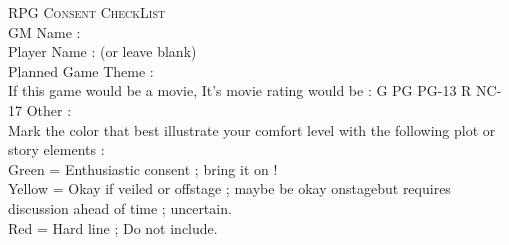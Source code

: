 \documentclass[11pt,twoside,a4paper]{article}
\begin{document}
\setlength\parindent{0pt}

\textsc{\centering \huge RPG Consent CheckList}~\\

GM Name : \dotfill~\\

Player Name : (or leave blank) \dotfill~\\

Planned Game Theme : \dotfill~\\

If this game would be a movie, It's movie rating would be : G PG PG-13 R NC-17 Other : \dotfill~\\

Mark the color that best illustrate your comfort level with the following plot or story elements :~\\


Green = Enthusiastic consent ; bring it on !~\\
Yellow = Okay if veiled or offstage ; maybe be okay onstagebut requires discussion ahead of time ; uncertain. ~\\
Red = Hard line ; Do not include.~\\ 

\end{document}
